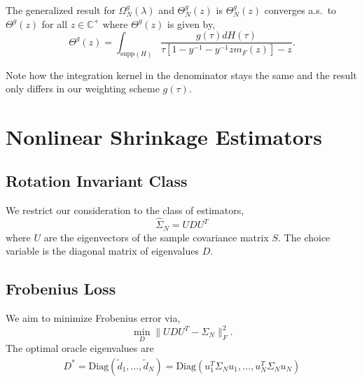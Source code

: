 \documentclass{article}
\begin{document}
The generalized result for $\Omega^g_N(\lambda)$ and $\Theta^g_N(z)$ is $\Theta^g_N(z)$
converges a.s.\ to $\Theta^g(z)$ for all $z \in \mathbb{C}^+$ where $\Theta^g(z)$ 
is given by,
\begin{equation}\label{eq:Theta}
	\Theta^g(z) = \int_{\mathrm{supp}(H)}
			 \frac{g(\tau)dH(\tau)}{\tau\left[1 - y^{-1} - y^{-1}z m_F(z) \right] - z}.
\end{equation}

Note how the integration kernel in the denominator stays the same and the result
only differs in our weighting scheme $g(\tau)$.

\section{Nonlinear Shrinkage Estimators}

\subsection{Rotation Invariant Class}

We restrict our consideration to the class of estimators,
\begin{equation}\label{eq:rotation_class}
	\hat{\Sigma}_N = U D U^T
\end{equation}
where $U$ are the eigenvectors of the sample covariance matrix $S$.  The choice
variable is the diagonal matrix of eigenvalues $D$.

\subsection{Frobenius Loss}\label{sec:fro_loss}

We aim to minimize Frobenius error via,
\begin{equation}\label{eq:fro_loss}
	\min_D \| UDU^T - \Sigma_N\|_F^2.
\end{equation}
The optimal oracle eigenvalues are
\begin{align}\label{eq:fro_oracle}
	D^* = \mathrm{Diag}(\tilde{d}_1, \ldots, \tilde{d}_N)
		  = \mathrm{Diag}(u_1^T \Sigma_N u_1, \ldots, u_N^T\Sigma_N u_N)
\end{align}
\end{document}
